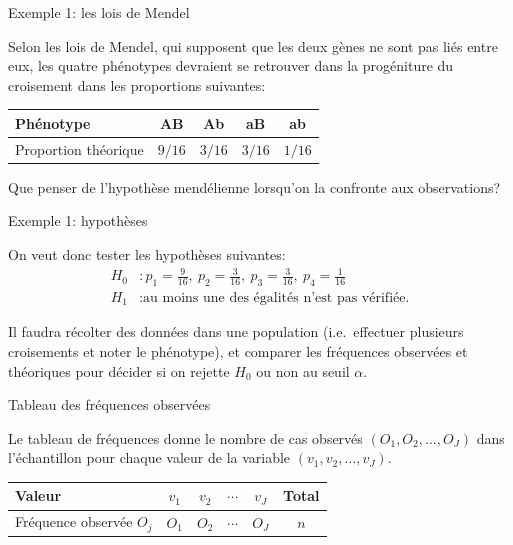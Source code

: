 \documentclass{BeamerTemplate}
\begin{document}
\begin{frame}[t]{Exemple 1: les lois de Mendel}

Selon les lois de Mendel, qui supposent que les deux gènes ne sont pas liés entre
eux, les quatre phénotypes devraient se retrouver dans la progéniture du
croisement dans les proportions suivantes:

\begin{center}
\renewcommand{\arraystretch}{1.4}
\begin{tabular}{lcccc}
\toprule
Phénotype & AB & Ab & aB & ab\\
\midrule
Proportion théorique & $9/16$ & $3/16$ & $3/16$ & $1/16$\\
\bottomrule
\end{tabular}
\end{center}

\medskip
Que penser de l'hypothèse mendélienne lorsqu'on la confronte aux observations?

\end{frame}

\begin{frame}[t]{Exemple 1: hypothèses}

On veut donc tester les hypothèses suivantes:
\begin{align*}
H_0&: p_1=\tfrac{9}{16},\ p_2=\tfrac{3}{16},\ p_3=\tfrac{3}{16},\ p_4=\tfrac{1}{16}\\
H_1&: \text{au moins une des égalités n'est pas vérifiée.}
\end{align*}

Il faudra récolter des données dans une population (i.e.\ effectuer plusieurs
croisements et noter le phénotype), et comparer les fréquences observées et
théoriques pour décider si on rejette $H_0$ ou non au seuil $\alpha$.


\end{frame}

\begin{frame}[t]{Tableau des fréquences observées}

Le tableau de fréquences donne le nombre de cas observés $(O_1,O_2,\ldots,O_J)$
dans l'échantillon pour chaque valeur de la variable $(v_1,v_2,\ldots,v_J)$.

\bigskip
\begin{center}
\renewcommand{\arraystretch}{1.4}
\begin{tabular}{l|cccc|c}
Valeur & $v_1$ & $v_2$ & $\cdots$ & $v_J$ & Total\\
\hline
Fréquence observée $O_j$ & $O_1$ & $O_2$ & $\cdots$ & $O_J$ & $n$\\
\end{tabular}
\end{center}

\end{frame}
\end{document}
